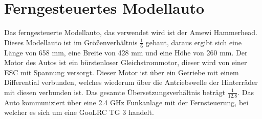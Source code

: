 \section{Ferngesteuertes Modellauto}
\label{sec:Auto}
Das ferngesteuerte Modellauto, das verwendet wird ist der Amewi Hammerhead. Dieses Modellauto ist im Größenverhältnis $\frac{1}{6}$ gebaut, daraus ergibt sich eine Länge von 658 \ac{mm}, eine Breite von 428 \ac{mm} und eine Höhe von 260 \ac{mm}. Der Motor des Autos ist ein bürstenloser Gleichstrommotor, dieser wird von einer \ac{ESC} mit Spannung versorgt. Dieser Motor ist über ein Getriebe mit einem Differential verbunden, welches wiederum über die Antriebswelle der Hinterräder mit diesen verbunden ist. Das gesamte Übersetzungsverhältnis beträgt $\frac{1}{12.8}$. Das Auto kommuniziert über eine 2.4 \ac{GHz} Funkanlage mit der Fernsteuerung, bei welcher es sich um eine GooLRC TG 3 handelt.